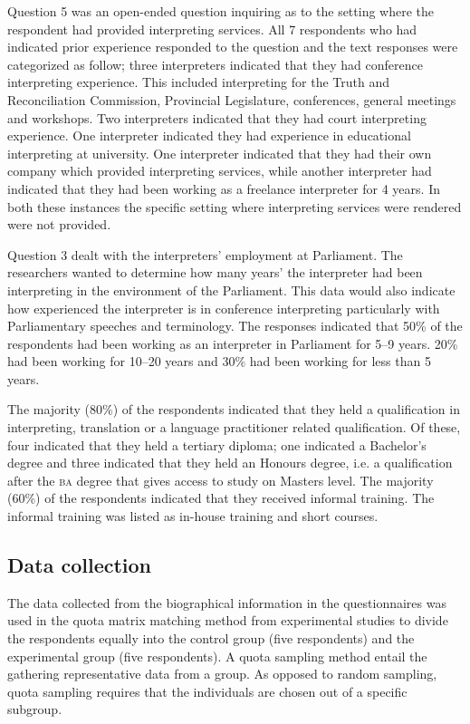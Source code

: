 \documentclass[output=paper]{langsci/langscibook}
\begin{document}
Question 5 was an open-ended question inquiring as to the setting where the respondent had provided interpreting services. All 7 respondents who had indicated prior experience responded to the question and the text responses were categorized as follow; three interpreters indicated that they had conference interpreting experience. This included interpreting for the Truth and Reconciliation Commission, Provincial Legislature, conferences, general meetings and workshops. Two interpreters indicated that they had court interpreting experience. One interpreter indicated they had experience in educational interpreting at university. One interpreter indicated that they had their own company which provided interpreting services, while another interpreter had indicated that they had been working as a freelance interpreter for 4 years. In both these instances the specific setting where interpreting services were rendered were not provided. 

Question 3 dealt with the interpreters’ employment at Parliament. The researchers wanted to determine how many years’ the interpreter had been interpreting in the environment of the Parliament. This data would also indicate how experienced the interpreter is in conference interpreting particularly with Parliamentary speeches and terminology. The responses indicated that 50\% of the respondents had been working as an interpreter in Parliament for 5--9 years. 20\% had been working for 10--20 years and 30\% had been working for less than 5 years. 

The majority (80\%) of the respondents indicated that they held a qualification in interpreting, translation or a language practitioner related qualification. Of these, four indicated that they held a tertiary diploma; one indicated a Bachelor’s degree and three indicated that they held an Honours degree, i.e. a qualification after the \textsc{ba} degree that gives access to study on Masters level. The majority (60\%) of the respondents indicated that they received informal training. The informal training was listed as in-house training and short courses.  


\subsection{Data collection}
The data collected from the biographical information in the questionnaires was used in the quota matrix matching method from experimental studies to divide the respondents equally into the control group (five respondents) and the experimental group (five respondents). A quota sampling method entail the gathering representative data from a group. As opposed to random sampling, quota sampling requires that the individuals are chosen out of a specific subgroup. 
\end{document}
